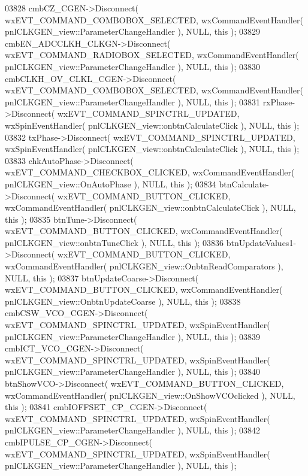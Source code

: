 \begin{DoxyCode}
03828     cmbCZ_CGEN->Disconnect( wxEVT\_COMMAND\_COMBOBOX\_SELECTED, wxCommandEventHandler( 
      pnlCLKGEN_view::ParameterChangeHandler ), NULL, \textcolor{keyword}{this} );
03829     cmbEN_ADCCLKH_CLKGN->Disconnect( wxEVT\_COMMAND\_RADIOBOX\_SELECTED, wxCommandEventHandler( 
      pnlCLKGEN_view::ParameterChangeHandler ), NULL, \textcolor{keyword}{this} );
03830     cmbCLKH_OV_CLKL_CGEN->Disconnect( wxEVT\_COMMAND\_COMBOBOX\_SELECTED, wxCommandEventHandler( 
      pnlCLKGEN_view::ParameterChangeHandler ), NULL, \textcolor{keyword}{this} );
03831     rxPhase->Disconnect( wxEVT\_COMMAND\_SPINCTRL\_UPDATED, wxSpinEventHandler( 
      pnlCLKGEN_view::onbtnCalculateClick ), NULL, \textcolor{keyword}{this} );
03832     txPhase->Disconnect( wxEVT\_COMMAND\_SPINCTRL\_UPDATED, wxSpinEventHandler( 
      pnlCLKGEN_view::onbtnCalculateClick ), NULL, \textcolor{keyword}{this} );
03833     chkAutoPhase->Disconnect( wxEVT\_COMMAND\_CHECKBOX\_CLICKED, wxCommandEventHandler( 
      pnlCLKGEN_view::OnAutoPhase ), NULL, \textcolor{keyword}{this} );
03834     btnCalculate->Disconnect( wxEVT\_COMMAND\_BUTTON\_CLICKED, wxCommandEventHandler( 
      pnlCLKGEN_view::onbtnCalculateClick ), NULL, \textcolor{keyword}{this} );
03835     btnTune->Disconnect( wxEVT\_COMMAND\_BUTTON\_CLICKED, wxCommandEventHandler( 
      pnlCLKGEN_view::onbtnTuneClick ), NULL, \textcolor{keyword}{this} );
03836     btnUpdateValues1->Disconnect( wxEVT\_COMMAND\_BUTTON\_CLICKED, wxCommandEventHandler( 
      pnlCLKGEN_view::OnbtnReadComparators ), NULL, \textcolor{keyword}{this} );
03837     btnUpdateCoarse->Disconnect( wxEVT\_COMMAND\_BUTTON\_CLICKED, wxCommandEventHandler( 
      pnlCLKGEN_view::OnbtnUpdateCoarse ), NULL, \textcolor{keyword}{this} );
03838     cmbCSW_VCO_CGEN->Disconnect( wxEVT\_COMMAND\_SPINCTRL\_UPDATED, wxSpinEventHandler( 
      pnlCLKGEN_view::ParameterChangeHandler ), NULL, \textcolor{keyword}{this} );
03839     cmbICT_VCO_CGEN->Disconnect( wxEVT\_COMMAND\_SPINCTRL\_UPDATED, wxSpinEventHandler( 
      pnlCLKGEN_view::ParameterChangeHandler ), NULL, \textcolor{keyword}{this} );
03840     btnShowVCO->Disconnect( wxEVT\_COMMAND\_BUTTON\_CLICKED, wxCommandEventHandler( 
      pnlCLKGEN_view::OnShowVCOclicked ), NULL, \textcolor{keyword}{this} );
03841     cmbIOFFSET_CP_CGEN->Disconnect( wxEVT\_COMMAND\_SPINCTRL\_UPDATED, wxSpinEventHandler( 
      pnlCLKGEN_view::ParameterChangeHandler ), NULL, \textcolor{keyword}{this} );
03842     cmbIPULSE_CP_CGEN->Disconnect( wxEVT\_COMMAND\_SPINCTRL\_UPDATED, wxSpinEventHandler( 
      pnlCLKGEN_view::ParameterChangeHandler ), NULL, \textcolor{keyword}{this} );

\end{DoxyCode}
